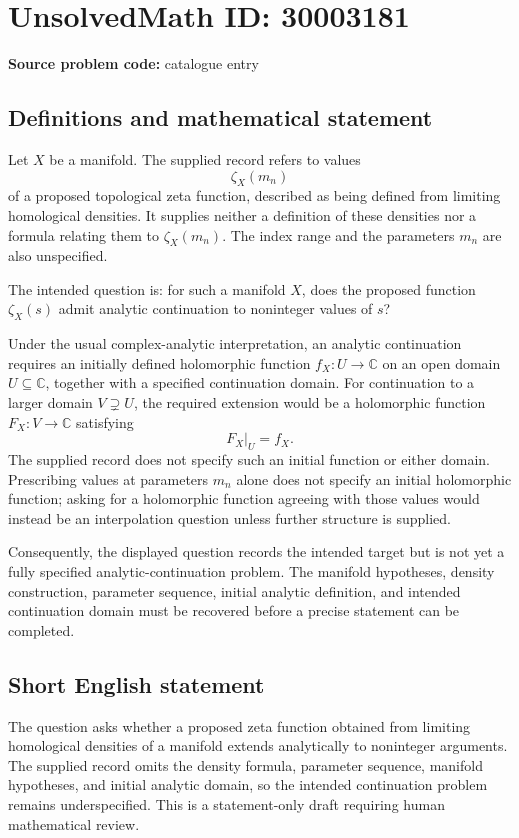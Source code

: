 \documentclass[11pt]{article}
\newcommand{\C}{\mathbb{C}}
\begin{document}
\section*{UnsolvedMath ID: 30003181}
\textbf{Source problem code:} catalogue entry
\subsection{Definitions and mathematical statement}
Let \(X\) be a manifold. The supplied record refers to values
\[
\zeta_X(m_n)
\]
of a proposed topological zeta function, described as being defined from limiting homological densities. It supplies neither a definition of these densities nor a formula relating them to \(\zeta_X(m_n)\). The index range and the parameters \(m_n\) are also unspecified.

The intended question is: for such a manifold \(X\), does the proposed function \(\zeta_X(s)\) admit analytic continuation to noninteger values of \(s\)?

Under the usual complex-analytic interpretation, an analytic continuation requires an initially defined holomorphic function \(f_X\colon U\to\C\) on an open domain \(U\subseteq\C\), together with a specified continuation domain. For continuation to a larger domain \(V\supsetneq U\), the required extension would be a holomorphic function \(F_X\colon V\to\C\) satisfying
\[
F_X|_U=f_X.
\]
The supplied record does not specify such an initial function or either domain. Prescribing values at parameters \(m_n\) alone does not specify an initial holomorphic function; asking for a holomorphic function agreeing with those values would instead be an interpolation question unless further structure is supplied.

Consequently, the displayed question records the intended target but is not yet a fully specified analytic-continuation problem. The manifold hypotheses, density construction, parameter sequence, initial analytic definition, and intended continuation domain must be recovered before a precise statement can be completed.
\subsection{Short English statement}
The question asks whether a proposed zeta function obtained from limiting homological densities of a manifold extends analytically to noninteger arguments. The supplied record omits the density formula, parameter sequence, manifold hypotheses, and initial analytic domain, so the intended continuation problem remains underspecified. This is a statement-only draft requiring human mathematical review.
\end{document}
